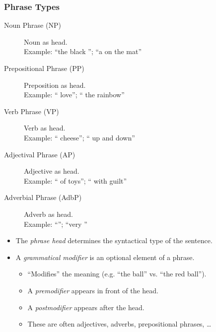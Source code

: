 			\subsubsection{Phrase Types} %
				\begin{description}
					\item[Noun Phrase (NP)] Noun as head. \\ Example: \enquote{the black \ambiguity{cat}}; \enquote{a  on the mat}
					\item[Prepositional Phrase (PP)] Preposition as head. \\ Example: \enquote{ love}; \enquote{ the rainbow}
					\item[Verb Phrase (VP)] Verb as head. \\ Example: \enquote{ cheese}; \enquote{ up and down}
					\item[Adjectival Phrase (AP)] Adjective as head. \\ Example: \enquote{ of toys}; \enquote{ with guilt}
					\item[Adverbial Phrase (AdbP)] Adverb as head. \\ Example: \enquote{}; \enquote{very }
				\end{description}
				\begin{itemize}
					\item The \textit{phrase head} determines the syntactical type of the sentence.
					\item A \textit{grammatical modifier} is an optional element of a phrase.
						\begin{itemize}
							\item \enquote{Modifies} the meaning (e.g. \enquote{the ball} vs. \enquote{the red ball}).
							\item A \textit{premodifier} appears in front of the head.
							\item A \textit{postmodifier} appears after the head.
							\item These are often adjectives, adverbs, prepositional phrases, \dots
						\end{itemize}
				\end{itemize}

